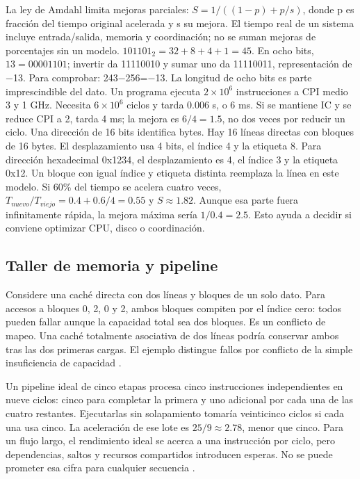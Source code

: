 La ley de Amdahl limita mejoras parciales: $S=1/((1-p)+p/s)$, donde p es fracción del tiempo original acelerada y s su mejora. El tiempo real de un sistema incluye entrada/salida, memoria y coordinación; no se suman mejoras de porcentajes sin un modelo.
$101101_2=32+8+4+1=45$. En ocho bits, $13=00001101$; invertir da 11110010 y sumar uno da 11110011, representación de −13. Para comprobar: 243−256=−13. La longitud de ocho bits es parte imprescindible del dato.
Un programa ejecuta $2\times10^6$ instrucciones a CPI medio 3 y 1 GHz. Necesita $6\times10^6$ ciclos y tarda 0.006 s, o 6 ms. Si se mantiene IC y se reduce CPI a 2, tarda 4 ms; la mejora es $6/4=1.5$, no dos veces por reducir un ciclo.
Una dirección de 16 bits identifica bytes. Hay 16 líneas directas con bloques de 16 bytes. El desplazamiento usa 4 bits, el índice 4 y la etiqueta 8. Para dirección hexadecimal 0x1234, el desplazamiento es 4, el índice 3 y la etiqueta 0x12. Un bloque con igual índice y etiqueta distinta reemplaza la línea en este modelo.
Si 60\% del tiempo se acelera cuatro veces, $T_{nuevo}/T_{viejo}=0.4+0.6/4=0.55$ y $S\approx1.82$. Aunque esa parte fuera infinitamente rápida, la mejora máxima sería $1/0.4=2.5$. Esto ayuda a decidir si conviene optimizar CPU, disco o coordinación.

\subsection{Taller de memoria y pipeline}
Considere una caché directa con dos líneas y bloques de un solo dato. Para accesos a bloques 0, 2, 0 y 2, ambos bloques compiten por el índice cero: todos pueden fallar aunque la capacidad total sea dos bloques. Es un conflicto de mapeo. Una caché totalmente asociativa de dos líneas podría conservar ambos tras las dos primeras cargas. El ejemplo distingue fallos por conflicto de la simple insuficiencia de capacidad \cite{intel,architecture}.

Un pipeline ideal de cinco etapas procesa cinco instrucciones independientes en nueve ciclos: cinco para completar la primera y uno adicional por cada una de las cuatro restantes. Ejecutarlas sin solapamiento tomaría veinticinco ciclos si cada una usa cinco. La aceleración de ese lote es $25/9\approx2.78$, menor que cinco. Para un flujo largo, el rendimiento ideal se acerca a una instrucción por ciclo, pero dependencias, saltos y recursos compartidos introducen esperas. No se puede prometer esa cifra para cualquier secuencia \cite{intel}.

